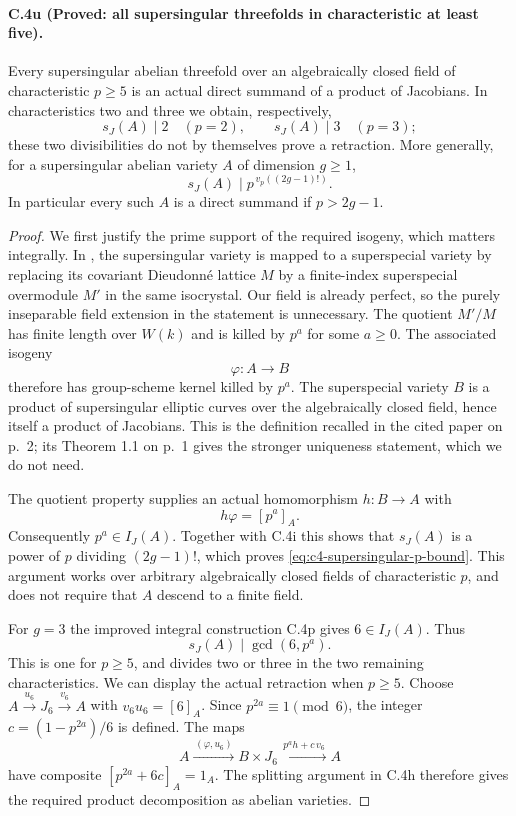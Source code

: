 \paragraph{C.4u (Proved: all supersingular threefolds in characteristic at least five).}
Every supersingular abelian threefold over an algebraically closed
field of characteristic \(p\ge5\) is an actual direct summand of a
product of Jacobians. In characteristics two and three we obtain,
respectively,
\[
       s_J(A)\mid2\quad(p=2),\qquad
       s_J(A)\mid3\quad(p=3);
\]
these two divisibilities do not by themselves prove a retraction.
More generally, for a supersingular abelian variety \(A\) of
dimension \(g\ge1\),
\begin{equation}\label{eq:c4-supersingular-p-bound}
       s_J(A)\mid p^{\,v_p((2g-1)!)}.
\end{equation}
In particular every such \(A\) is a direct summand if \(p>2g-1\).

\begin{proof}
We first justify the prime support of the required isogeny,
which matters integrally. In
\citet[Lemma 3.2 and its proof, author-version p.~7,
using Lemma 2.4, p.~5]{frC4YuSupersingular2017},
the supersingular variety is mapped to a superspecial variety
by replacing its covariant Dieudonn\'e lattice \(M\) by a
finite-index superspecial overmodule \(M'\) in the same
isocrystal. Our field is already perfect, so the purely
inseparable field extension in the statement is unnecessary.
The quotient \(M'/M\) has finite length over \(W(k)\) and is
killed by \(p^a\) for some \(a\ge0\). The associated isogeny
\[
                         \varphi:A\longrightarrow B
\]
therefore has group-scheme kernel killed by \(p^a\).
The superspecial variety \(B\) is a product of supersingular
elliptic curves over the algebraically closed field, hence
itself a product of Jacobians. This is the definition recalled
in the cited paper on p.~2; its Theorem 1.1 on p.~1 gives the
stronger uniqueness statement, which we do not need.

The quotient property supplies an actual homomorphism
\(h:B\to A\) with
\[
                            h\varphi=[p^a]_A.
\]
Consequently \(p^a\in I_J(A)\). Together with C.4i this shows
that \(s_J(A)\) is a power of \(p\) dividing \((2g-1)!\),
which proves \eqref{eq:c4-supersingular-p-bound}.
This argument works over arbitrary algebraically closed
fields of characteristic \(p\), and does not require that
\(A\) descend to a finite field.

For \(g=3\) the improved integral construction C.4p gives
\(6\in I_J(A)\). Thus
\[
                         s_J(A)\mid\gcd(6,p^a).
\]
This is one for \(p\ge5\), and divides two or three in the
two remaining characteristics. We can display the actual
retraction when \(p\ge5\). Choose
\(A\xrightarrow{u_6}J_6\xrightarrow{v_6}A\)
with \(v_6u_6=[6]_A\). Since \(p^{2a}\equiv1\pmod6\),
the integer \(c=(1-p^{2a})/6\) is defined. The maps
\[
 A\xrightarrow{\,(\varphi,u_6)\,}B\times J_6
       \xrightarrow{\,p^a h+c\,v_6\,}A
\]
have composite
\([p^{2a}+6c]_A=1_A\).
The splitting argument in C.4h therefore gives the required
product decomposition as abelian varieties.
\end{proof}

